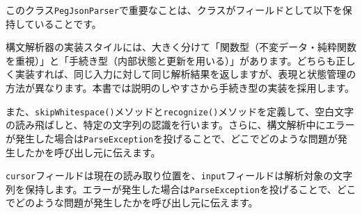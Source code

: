 \begin{Shaded}
\begin{Highlighting}[]
    \CommentTok{/**}\CommentTok{:}\CommentTok{=}\CommentTok{|}\CommentTok{\{}\CommentTok{\}}\CommentTok{*/}
     \NormalTok{() \{}
\NormalTok{    \}}

    \CommentTok{/**}\CommentTok{:}\CommentTok{=}\CommentTok{|}\CommentTok{\{}\CommentTok{\}}
    \CommentTok{*/}
     \NormalTok{() \{}
\NormalTok{    \}}
\NormalTok{\}}
\end{Highlighting}
\end{Shaded}

このクラス\texttt{PegJsonParser}で重要なことは、クラスがフィールドとして以下を保持していることです。

\begin{Shaded}
\begin{Highlighting}[]
 
     
     
\NormalTok{\}}
\end{Highlighting}
\end{Shaded}

構文解析器の実装スタイルには、大きく分けて「関数型（不変データ・純粋関数を重視）」と「手続き型（内部状態と更新を用いる）」があります。どちらも正しく実装すれば、同じ入力に対して同じ解析結果を返しますが、表現と状態管理の方法が異なります。本書では説明のしやすさから手続き型の実装を採用します。

また、\texttt{skipWhitespace()}メソッドと\texttt{recognize()}メソッドを定義して、空白文字の読み飛ばしと、特定の文字列の認識を行います。さらに、構文解析中にエラーが発生した場合は\texttt{ParseException}を投げることで、どこでどのような問題が発生したかを呼び出し元に伝えます。

\texttt{cursor}フィールドは現在の読み取り位置を、\texttt{input}フィールドは解析対象の文字列を保持します。エラーが発生した場合は\texttt{ParseException}を投げることで、どこでどのような問題が発生したかを呼び出し元に伝えます。

